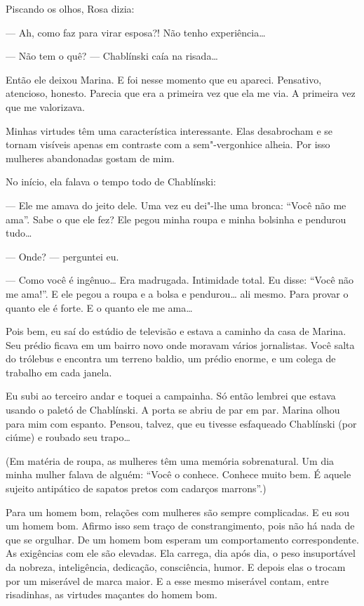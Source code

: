 Piscando os olhos, Rosa dizia:

--- Ah, como faz para virar esposa?! Não tenho experiência\ldots{}

--- Não tem o quê? --- Chablínski caía na risada\ldots{}

Então ele deixou Marina. E foi nesse momento que eu apareci. Pensativo,
atencioso, honesto. Parecia que era a primeira vez que ela me via. A
primeira vez que me valorizava.

Minhas virtudes têm uma característica interessante. Elas desabrocham e
se tornam visíveis apenas em contraste com a sem"-vergonhice alheia. Por
isso mulheres abandonadas gostam de mim.

No início, ela falava o tempo todo de Chablínski:

--- Ele me amava do jeito dele. Uma vez eu dei"-lhe uma bronca: ``Você
não me ama''. Sabe o que ele fez? Ele pegou minha roupa e minha bolsinha
e pendurou tudo\ldots{}

--- Onde? --- perguntei eu.

--- Como você é ingênuo\ldots{} Era madrugada. Intimidade total. Eu disse:
``Você não me ama!''. E ele pegou a roupa e a bolsa e pendurou\ldots{} ali
mesmo. Para provar o quanto ele é forte. E o quanto ele me ama\ldots{}

Pois bem, eu saí do estúdio de televisão e estava a caminho da casa de
Marina. Seu prédio ficava em um bairro novo onde moravam vários
jornalistas. Você salta do trólebus e encontra um terreno baldio, um
prédio enorme, e um colega de trabalho em cada janela.

Eu subi ao terceiro andar e toquei a campainha. Só então lembrei que
estava usando o paletó de Chablínski. A porta se abriu de par em par.
Marina olhou para mim com espanto. Pensou, talvez, que eu tivesse
esfaqueado Chablínski (por ciúme) e roubado seu trapo\ldots{}

(Em matéria de roupa, as mulheres têm uma memória sobrenatural. Um dia
minha mulher falava de alguém: ``Você o conhece. Conhece muito bem. É
aquele sujeito antipático de sapatos pretos com cadarços marrons''.)

Para um homem bom, relações com mulheres são sempre complicadas. E eu
sou um homem bom. Afirmo isso sem traço de constrangimento, pois não há
nada de que se orgulhar. De um homem bom esperam um comportamento
correspondente. As exigências com ele são elevadas. Ela carrega, dia
após dia, o peso insuportável da nobreza, inteligência, dedicação,
consciência, humor. E depois elas o trocam por um miserável de marca
maior. E a esse mesmo miserável contam, entre risadinhas, as virtudes
maçantes do homem bom.

